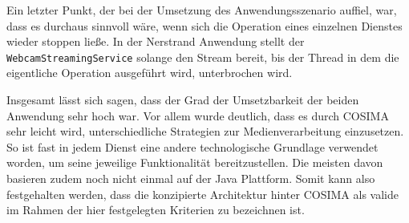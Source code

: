   Ein letzter Punkt, der bei der Umsetzung des Anwendungsszenario auffiel, war, dass es durchaus sinnvoll wäre, wenn sich die Operation eines einzelnen Dienstes wieder stoppen ließe. In der Nerstrand Anwendung stellt der \verb!WebcamStreamingService! solange den Stream bereit, bis der Thread in dem die eigentliche Operation ausgeführt wird, unterbrochen wird.

  
  Insgesamt lässt sich sagen, dass der Grad der Umsetzbarkeit der beiden Anwendung sehr hoch war. Vor allem wurde deutlich, dass es durch COSIMA sehr leicht wird, unterschiedliche Strategien zur Medienverarbeitung einzusetzen. So ist fast in jedem Dienst eine andere technologische Grundlage verwendet worden, um seine jeweilige Funktionalität bereitzustellen. Die meisten davon basieren zudem noch nicht einmal auf der Java Plattform. Somit kann also festgehalten werden, dass die konzipierte Architektur hinter COSIMA als valide im Rahmen der hier festgelegten Kriterien zu bezeichnen ist.

